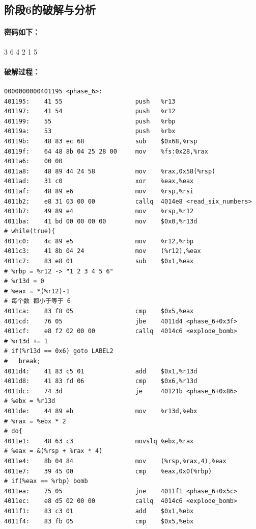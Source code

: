 \subsection{阶段6的破解与分析}

\paragraph{密码如下：}3 6 4 2 1 5

\paragraph{破解过程：}
\begin{verbatim}
0000000000401195 <phase_6>:
401195:    41 55                    push   %r13
401197:    41 54                    push   %r12
401199:    55                       push   %rbp
40119a:    53                       push   %rbx
40119b:    48 83 ec 68              sub    $0x68,%rsp
40119f:    64 48 8b 04 25 28 00     mov    %fs:0x28,%rax
4011a6:    00 00 
4011a8:    48 89 44 24 58           mov    %rax,0x58(%rsp)
4011ad:    31 c0                    xor    %eax,%eax
4011af:    48 89 e6                 mov    %rsp,%rsi
4011b2:    e8 31 03 00 00           callq  4014e8 <read_six_numbers>
4011b7:    49 89 e4                 mov    %rsp,%r12
4011ba:    41 bd 00 00 00 00        mov    $0x0,%r13d
# while(true){
4011c0:    4c 89 e5                 mov    %r12,%rbp
4011c3:    41 8b 04 24              mov    (%r12),%eax
4011c7:    83 e8 01                 sub    $0x1,%eax
# %rbp = %r12 -> "1 2 3 4 5 6"
# %r13d = 0
# %eax = *(%r12)-1
# 每个数 都小于等于 6
4011ca:    83 f8 05                 cmp    $0x5,%eax
4011cd:    76 05                    jbe    4011d4 <phase_6+0x3f>
4011cf:    e8 f2 02 00 00           callq  4014c6 <explode_bomb>
# %r13d += 1
# if(%r13d == 0x6) goto LABEL2
#   break;
4011d4:    41 83 c5 01              add    $0x1,%r13d
4011d8:    41 83 fd 06              cmp    $0x6,%r13d
4011dc:    74 3d                    je     40121b <phase_6+0x86>
# %ebx = %r13d
4011de:    44 89 eb                 mov    %r13d,%ebx
# %rax = %ebx * 2
# do{
4011e1:    48 63 c3                 movslq %ebx,%rax
# %eax = &(%rsp + %rax * 4)
4011e4:    8b 04 84                 mov    (%rsp,%rax,4),%eax
4011e7:    39 45 00                 cmp    %eax,0x0(%rbp)
# if(%eax == %rbp) bomb
4011ea:    75 05                    jne    4011f1 <phase_6+0x5c>
4011ec:    e8 d5 02 00 00           callq  4014c6 <explode_bomb>
4011f1:    83 c3 01                 add    $0x1,%ebx
4011f4:    83 fb 05                 cmp    $0x5,%ebx

\end{verbatim}
